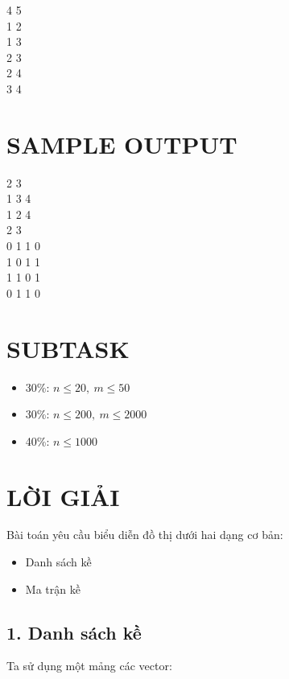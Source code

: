 \documentclass[a4paper,12pt]{article}
\begin{document}
\begin{tcolorbox}
4 5 \\
1 2 \\
1 3 \\
2 3 \\
2 4 \\
3 4
\end{tcolorbox}

\section*{SAMPLE OUTPUT}

\begin{tcolorbox}
2 3 \\
1 3 4 \\
1 2 4 \\
2 3 \\

0 1 1 0 \\
1 0 1 1 \\
1 1 0 1 \\
0 1 1 0
\end{tcolorbox}

\section*{SUBTASK}

\begin{itemize}
    \item 30\%: $n \le 20,\ m \le 50$
    \item 30\%: $n \le 200,\ m \le 2000$
    \item 40\%: $n \le 1000$
\end{itemize}

\section*{LỜI GIẢI}

Bài toán yêu cầu biểu diễn đồ thị dưới hai dạng cơ bản:
\begin{itemize}
    \item Danh sách kề
    \item Ma trận kề
\end{itemize}

\subsection*{1. Danh sách kề}

Ta sử dụng một mảng các vector:
\end{document}
